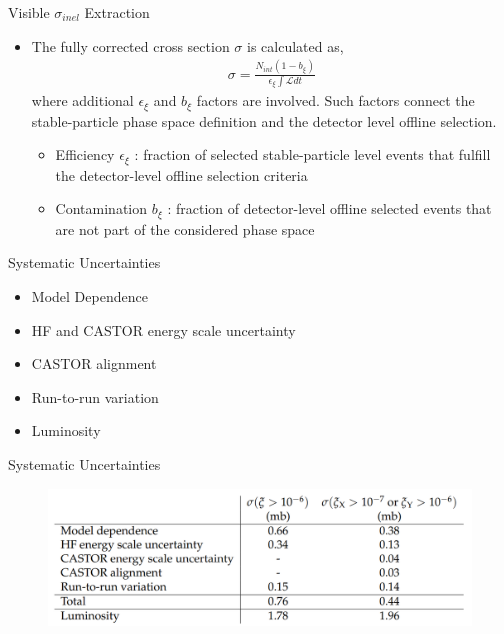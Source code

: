 \documentclass[aspectratio=169,xcolor=dvipsnames]{beamer}
\begin{document}
\begin{frame}{Visible $\sigma_{inel}$ Extraction}
	\begin{itemize}
		\item The fully corrected cross section $\sigma$ is calculated as,
		\begin{align*}
			\sigma = \frac{N_{int}(1-b_\xi)}{\epsilon_\xi \int \mathcal{L} dt}
		\end{align*}
		where additional $\epsilon_\xi$ and $b_\xi$ factors are involved. Such factors connect the stable-particle phase space definition and the detector level offline selection. \vspace{0.1in}
		\begin{itemize}
			\item Efficiency  $\epsilon_\xi$ : fraction of selected stable-particle level events that fulfill the detector-level offline selection criteria
			\item Contamination $b_\xi$ : fraction of detector-level offline selected events that are not part of the considered phase space 
		\end{itemize}
	\end{itemize}
\end{frame}

\begin{frame}{Systematic Uncertainties}
	\begin{itemize}
		\item Model Dependence
		\item HF and CASTOR energy scale uncertainty 
		\item CASTOR alignment
		\item Run-to-run variation 
		\item Luminosity 
	\end{itemize}
\end{frame}

\begin{frame}{Systematic Uncertainties}
\begin{figure}
	\centering
	\includegraphics[width=0.85\linewidth]{screenshot006}
\end{figure}

\end{frame}
\end{document}
